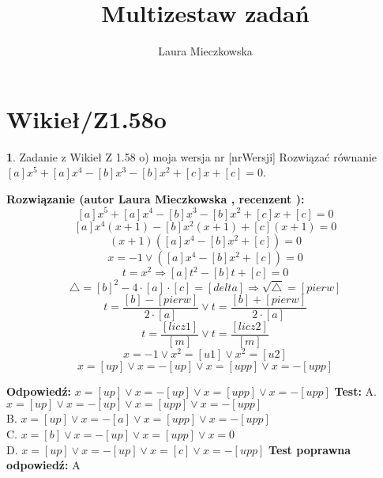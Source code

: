 \documentclass[12pt, a4paper]{article}
\title{Multizestaw zadań}
\author{Laura Mieczkowska}
\date{}
\theoremstyle{definition} %
\newtheorem{zad}{}
\newcommand{\kategoria}[1]{\section{#1}} %
\newcommand{\zadStart}[1]{\begin{zad}#1\newline} %
\newcommand{\zadStop}{\end{zad}}   %
\newcommand{\rozwStart}[2]{\noindent \textbf{Rozwiązanie (autor #1 , recenzent #2): }\newline} %
\newcommand{\odpStart}{\noindent \textbf{Odpowiedź:}\newline}    %
\newcommand{\odpStop}{\newline}                                             %
\newcommand{\testStart}{\noindent \textbf{Test:}\newline} %
\newcommand{\testStop}{\newline} %
\newcommand{\kluczStart}{\noindent \textbf{Test poprawna odpowiedź:}\newline} %
\newcommand{\kluczStop}{\newline} %
\begin{document}
\maketitle


\kategoria{Wikieł/Z1.58o}
\zadStart{Zadanie z Wikieł Z 1.58 o) moja wersja nr [nrWersji]}
Rozwiązać równanie $[a]x^5+[a]x^4-[b]x^3-[b]x^2+[c]x+[c]=0$.
\zadStop
\rozwStart{Laura Mieczkowska}{}
$$[a]x^5+[a]x^4-[b]x^3-[b]x^2+[c]x+[c]=0$$
$$[a]x^4(x+1)-[b]x^2(x+1)+[c](x+1)=0$$
$$(x+1)([a]x^4-[b]x^2+[c])=0$$
$$x=-1 \vee ([a]x^4-[b]x^2+[c])=0$$
$$t=x^2 \Rightarrow [a]t^2-[b]t+[c]=0$$
$$\triangle=[b]^2-4\cdot [a] \cdot [c]=[delta] \Rightarrow \sqrt{\triangle}=[pierw]$$
$$t=\frac{[b]-[pierw]}{2\cdot[a]} \vee t=\frac{[b]+[pierw]}{2\cdot[a]}$$
$$t=\frac{[licz1]}{[m]} \vee t=\frac{[licz2]}{[m]}$$
$$x=-1 \vee x^2=[u1] \vee x^2=[u2]$$
$$x=[up] \vee x=-[up] \vee x=[upp] \vee x=-[upp]$$

\odpStart
$x=[up] \vee x=-[up] \vee x=[upp] \vee x=-[upp]$
\odpStop
\testStart
A. $x=[up] \vee x=-[up] \vee x=[upp] \vee x=-[upp]$ \\
B. $x=[up] \vee x=-[a] \vee x=[upp] \vee x=-[upp]$ \\
C. $x=[b] \vee x=-[up] \vee x=[upp] \vee x=0$ \\
D. $x=[up] \vee x=-[up] \vee x=[c] \vee x=-[upp]$ 
\testStop
\kluczStart
A
\kluczStop
\end{document}
